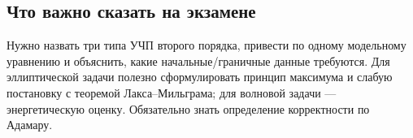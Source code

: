 \subsection{Что важно сказать на экзамене}

Нужно назвать три типа УЧП второго порядка, привести по одному модельному
уравнению и объяснить, какие начальные/граничные данные требуются. Для
эллиптической задачи полезно сформулировать принцип максимума и слабую
постановку с теоремой Лакса--Мильграма; для волновой задачи --- энергетическую
оценку. Обязательно знать определение корректности по Адамару.

\newpage
